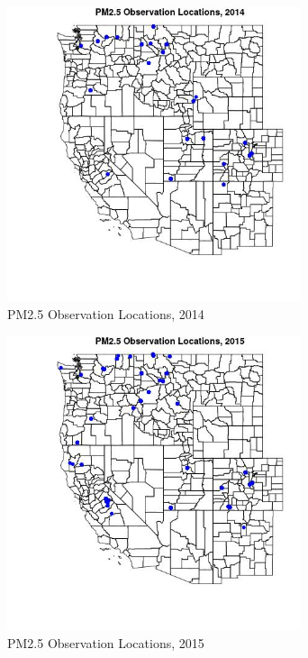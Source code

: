 \begin{figure} 
\centering  
\includegraphics[width=0.77\textwidth]{Code_Outputs/Report_PM25_Step4_part_e_de_duplicated_aves_ML_input_PlotLoc2014.jpg} 
\caption{\label{fig:Report_PM25_Step4_part_e_de_duplicated_aves_ML_inputPlotLoc2014}PM2.5 Observation Locations, 2014} 
\end{figure} 
 

\begin{figure} 
\centering  
\includegraphics[width=0.77\textwidth]{Code_Outputs/Report_PM25_Step4_part_e_de_duplicated_aves_ML_input_PlotLoc2015.jpg} 
\caption{\label{fig:Report_PM25_Step4_part_e_de_duplicated_aves_ML_inputPlotLoc2015}PM2.5 Observation Locations, 2015} 
\end{figure} 
 

